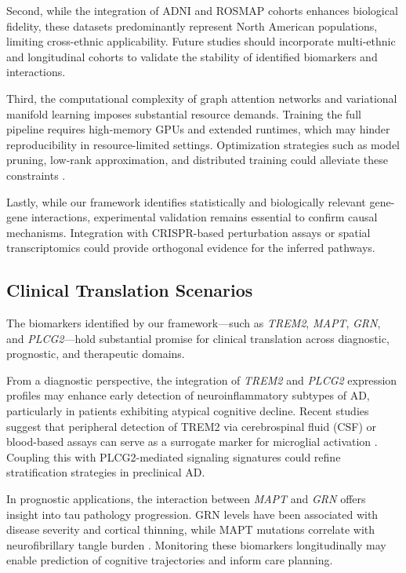 \documentclass[12pt]{article}
\begin{document}
Second, while the integration of ADNI and ROSMAP cohorts enhances biological fidelity, these datasets predominantly represent North American populations, limiting cross-ethnic applicability. Future studies should incorporate multi-ethnic and longitudinal cohorts to validate the stability of identified biomarkers and interactions.

Third, the computational complexity of graph attention networks and variational manifold learning imposes substantial resource demands. Training the full pipeline requires high-memory GPUs and extended runtimes, which may hinder reproducibility in resource-limited settings. Optimization strategies such as model pruning, low-rank approximation, and distributed training could alleviate these constraints \citep{xu2023scalable}.

Lastly, while our framework identifies statistically and biologically relevant gene-gene interactions, experimental validation remains essential to confirm causal mechanisms. Integration with CRISPR-based perturbation assays or spatial transcriptomics could provide orthogonal evidence for the inferred pathways.

\subsection*{Clinical Translation Scenarios}

The biomarkers identified by our framework—such as \textit{TREM2}, \textit{MAPT}, \textit{GRN}, and \textit{PLCG2}—hold substantial promise for clinical translation across diagnostic, prognostic, and therapeutic domains.

From a diagnostic perspective, the integration of \textit{TREM2} and \textit{PLCG2} expression profiles may enhance early detection of neuroinflammatory subtypes of AD, particularly in patients exhibiting atypical cognitive decline. Recent studies suggest that peripheral detection of TREM2 via cerebrospinal fluid (CSF) or blood-based assays can serve as a surrogate marker for microglial activation \citep{suarez2022trem2}. Coupling this with PLCG2-mediated signaling signatures could refine stratification strategies in preclinical AD.

In prognostic applications, the interaction between \textit{MAPT} and \textit{GRN} offers insight into tau pathology progression. GRN levels have been associated with disease severity and cortical thinning, while MAPT mutations correlate with neurofibrillary tangle burden \citep{petkau2016grn, bevan2020mapt}. Monitoring these biomarkers longitudinally may enable prediction of cognitive trajectories and inform care planning.
\end{document}
